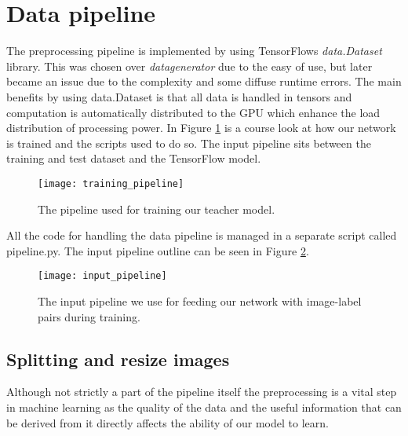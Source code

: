 \documentclass[thesis.tex]{subfiles}
\begin{document}
\section{Data pipeline} \label{sec:data_pipeline}
The preprocessing pipeline is implemented by using TensorFlows \textit{data.Dataset} library. This was chosen over \textit{datagenerator} due to the easy of use, but later became an issue due to the complexity and some diffuse runtime errors. The main benefits by using data.Dataset is that all data is handled in tensors and computation is automatically distributed to the GPU which enhance the load distribution of processing power. In Figure \ref{fig:training_pipeline} is a course look at how our network is trained and the scripts used to do so. The input pipeline sits between the training and test dataset and the TensorFlow model.

\begin{figure} %
  \begin{center}
    \texttt{[image: training\_pipeline]}
    \caption[Pipeline for training model.]{The pipeline used for training our teacher model.}
    \label{fig:training_pipeline}
  \end{center}
\end{figure}

All the code for handling the data pipeline is managed in a separate script called pipeline.py. The input pipeline outline can be seen in Figure \ref{fig:input_pipeline}.

\begin{figure} %
  \begin{center}
    \texttt{[image: input\_pipeline]}
    \caption[The input pipeline]{The input pipeline we use for feeding our network with image-label pairs during training.}
    \label{fig:input_pipeline}
  \end{center}
\end{figure}




\subsection{Splitting and resize images}
Although not strictly a part of the pipeline itself the preprocessing is a vital step in machine learning as the quality of the data and the useful information that can be derived from it directly affects the ability of our model to learn.
\end{document}
